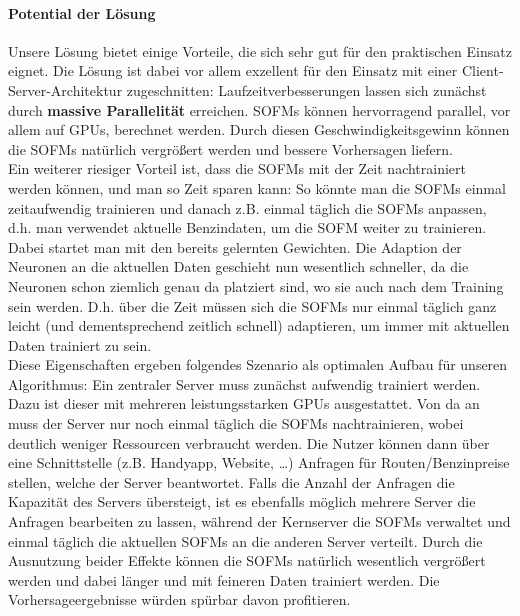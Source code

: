 \documentclass[11pt]{article}
\begin{document}
	
	\paragraph{Potential der Lösung\\}
	\label{potential}
	Unsere Lösung bietet einige Vorteile, die sich sehr gut für den praktischen Einsatz eignet. Die Lösung ist dabei vor allem exzellent für den Einsatz mit einer Client-Server-Architektur zugeschnitten:
	Laufzeitverbesserungen lassen sich zunächst durch \textbf{massive Parallelität} erreichen. SOFMs können hervorragend parallel, vor allem auf GPUs, berechnet werden. Durch diesen Geschwindigkeitsgewinn können die SOFMs natürlich vergrößert werden und bessere Vorhersagen liefern.\\
	Ein weiterer riesiger Vorteil ist, dass die SOFMs mit der Zeit \glqq nachtrainiert\grqq{} werden können, und man so Zeit sparen kann: So könnte man die SOFMs einmal zeitaufwendig trainieren und danach z.B. einmal täglich die SOFMs anpassen, d.h. man verwendet aktuelle Benzindaten, um die SOFM weiter zu trainieren. Dabei startet man mit den bereits gelernten Gewichten. Die Adaption der Neuronen an die aktuellen Daten geschieht nun wesentlich schneller, da die Neuronen schon ziemlich genau da platziert sind, wo sie auch nach dem Training sein werden. D.h. über die Zeit müssen sich die SOFMs nur einmal täglich ganz leicht (und dementsprechend zeitlich schnell) adaptieren, um immer mit aktuellen Daten trainiert zu sein.\\
	Diese Eigenschaften ergeben folgendes Szenario als optimalen Aufbau für unseren Algorithmus: Ein zentraler Server muss zunächst aufwendig trainiert werden. Dazu ist dieser mit mehreren leistungsstarken GPUs ausgestattet. Von da an muss der Server nur noch einmal täglich die SOFMs nachtrainieren, wobei deutlich weniger Ressourcen verbraucht werden. Die Nutzer können dann über eine Schnittstelle (z.B. Handyapp, Website, \dots) Anfragen für Routen/Benzinpreise stellen, welche der Server beantwortet. Falls die Anzahl der Anfragen die Kapazität des Servers übersteigt, ist es ebenfalls möglich mehrere Server die Anfragen bearbeiten zu lassen, während der Kernserver die SOFMs verwaltet und einmal täglich die aktuellen SOFMs an die anderen Server verteilt. Durch die Ausnutzung beider Effekte können die SOFMs natürlich wesentlich vergrößert werden und dabei länger und mit feineren Daten trainiert werden. Die Vorhersageergebnisse würden spürbar davon profitieren.
	
	
	
\end{document}
